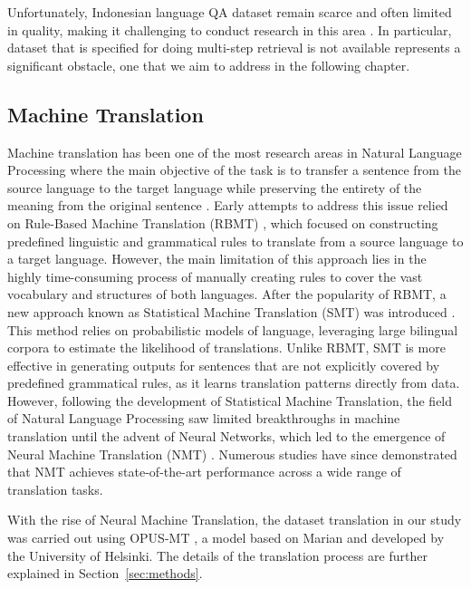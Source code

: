 \documentclass[times]{iapress}
\begin{document}
Unfortunately, Indonesian language QA dataset remain scarce and often limited in quality,  making it challenging to conduct research in this area \cite{indoqa} \cite{qasina}. In particular, dataset that is specified for doing multi-step retrieval is not available represents a significant obstacle, one that we aim to address in the following chapter.

\subsection{Machine Translation}
Machine translation has been one of the most research areas in Natural Language Processing where the main objective of the task is to transfer a sentence from the source language to the target language while preserving the entirety of the meaning from the original sentence \cite{mt_definition} \cite{mt_progress}. Early attempts to address this issue relied on Rule-Based Machine Translation (RBMT) \cite{rbmt}, which focused on constructing predefined linguistic and grammatical rules to translate from a source language to a target language. However, the main limitation of this approach lies in the highly time-consuming process of manually creating rules to cover the vast vocabulary and structures of both languages. After the popularity of RBMT, a new approach known as Statistical Machine Translation (SMT) was introduced \cite{smt}. This method relies on probabilistic models of language, leveraging large bilingual corpora to estimate the likelihood of translations. Unlike RBMT, SMT is more effective in generating outputs for sentences that are not explicitly covered by predefined grammatical rules, as it learns translation patterns directly from data. However, following the development of Statistical Machine Translation, the field of Natural Language Processing saw limited breakthroughs in machine translation until the advent of Neural Networks, which led to the emergence of Neural Machine Translation (NMT) \cite{nmt}. Numerous studies have since demonstrated that NMT achieves state-of-the-art performance across a wide range of translation tasks.

With the rise of Neural Machine Translation, the dataset translation in our study was carried out using OPUS-MT \cite{opus_mt}, a model based on Marian \cite{marian} and developed by the University of Helsinki. The details of the translation process are further explained in Section~\ref{sec:methods}.
\end{document}
